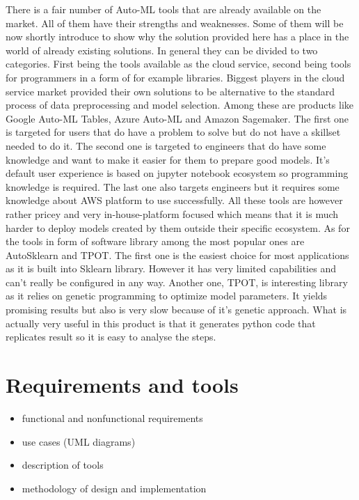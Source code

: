 \documentclass[a4paper,twoside,12pt]{book}
\begin{document}
There is a fair number of Auto-ML tools that are already available on the market. All of them have their strengths and weaknesses. Some of them will be now shortly introduce to show why the solution provided here has a place in the world of already existing solutions.
In general they can be divided to two categories. First being the tools available as the cloud service, second being tools for programmers in a form of for example libraries.
Biggest players in the cloud service market provided their own solutions to be alternative to the standard process of data preprocessing and model selection.
Among these are products like Google Auto-ML Tables, Azure Auto-ML and Amazon Sagemaker. The first one is targeted for users that do have a problem to solve but do not have a skillset needed to do it. The second one is targeted to engineers that do have some knowledge and want to make it easier for them to prepare good models. It's default user experience is based on jupyter notebook ecosystem so programming knowledge is required. The last one also targets engineers but it requires some knowledge about AWS platform to use successfully. All these tools are however rather pricey and very in-house-platform focused which means that it is much harder to deploy models created by them outside their specific ecosystem.
As for the tools in form of software library among the most popular ones are AutoSklearn and TPOT.
The first one is the easiest choice for most applications as it is built into Sklearn library. However it has very limited capabilities and can't really be configured in any way. 
Another one, TPOT, is interesting library as it relies on genetic programming to optimize model parameters. It yields promising results but also is very slow because of it's genetic approach. What is actually very useful in this product is that it generates python code that replicates result so it is easy to analyse the steps. 

\chapter{Requirements and tools}

\begin{itemize}
\item functional and nonfunctional requirements
\item use cases (UML diagrams)
\item description of tools
\item methodology of design and implementation
\end{itemize}
\end{document}
